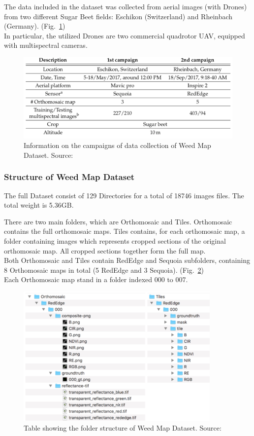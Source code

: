 The data included in the dataset was collected from aerial images (with Drones) from two different Sugar Beet fields: Eschikon (Switzerland) and Rheinbach (Germany). (Fig.~\ref{fig:figure-4.1.2})
\\[0.3cm]In particular, the utilized Drones are two commercial quadrotor UAV, equipped with multispectral cameras.
\begin{figure}[t]
	\centering
	\includegraphics[width=13cm]{figures/figure-4.1.2.png}
	\caption[Information on Campaigns of Weed Map Dataset]{Information on the campaigns of data collection of Weed Map Dataset. Source:~\cite{Tesi-2.1}}
	\label{fig:figure-4.1.2}
\end{figure}

\subsubsection{Structure of Weed Map Dataset}

The full Dataset consist of 129 Directories for a total of 18746 images files. The total weight is 5.36GB.

There are two main folders, which are Orthomosaic and Tiles.
Orthomosaic contains the full orthomosaic maps.
Tiles contains, for each orthomosaic map, a folder containing images which represents cropped sections of the original orthomosaic map. All cropped sections together form the full map.
\\[0.3cm]Both Orthomosaic and Tiles contain RedEdge and Sequoia subfolders, containing 8 Orthomosaic maps in total (5 RedEdge and 3 Sequoia). (Fig.~\ref{fig:figure-4.1.3})
\\[0.3cm]Each Orthomosaic map stand in a folder indexed 000 to 007.
\begin{figure}[t]
	\centering
	\includegraphics[width=10cm]{figures/figure-4.1.3.png}
	\caption[Folder Structure Weed Map Dataset]{Table showing the folder structure of Weed Map Dataset. Source:~\cite{Tesi-2.1}}
	\label{fig:figure-4.1.3}
\end{figure}

